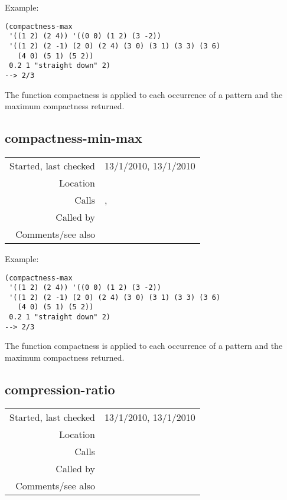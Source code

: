 \vspace{0.5cm}
\noindent Example:
\begin{verbatim}
(compactness-max
 '((1 2) (2 4)) '((0 0) (1 2) (3 -2))
 '((1 2) (2 -1) (2 0) (2 4) (3 0) (3 1) (3 3) (3 6)
   (4 0) (5 1) (5 2))
 0.2 1 "straight down" 2)
--> 2/3
\end{verbatim}

\noindent The function compactness is applied to each
occurrence of a pattern and the maximum compactness
returned.


\subsection*{compactness-min-max}\label{fun:compactness-min-max}

\vspace{0.3cm}
\begin{tabular}{r|p{8cm}}
Started, last checked & 13/1/2010, 13/1/2010 \\
Location & \nameref{sec:evaluation-heuristics} \\
Calls & \nameref{fun:index-item-1st-occurs}, \nameref{fun:my-last} \\
Called by & \nameref{fun:compactness-max} \\
Comments/see also &
\end{tabular}

\vspace{0.5cm}
\noindent Example:
\begin{verbatim}
(compactness-max
 '((1 2) (2 4)) '((0 0) (1 2) (3 -2))
 '((1 2) (2 -1) (2 0) (2 4) (3 0) (3 1) (3 3) (3 6)
   (4 0) (5 1) (5 2))
 0.2 1 "straight down" 2)
--> 2/3
\end{verbatim}

\noindent The function compactness is applied to each
occurrence of a pattern and the maximum compactness
returned.


\subsection*{compression-ratio}\label{fun:compression-ratio}

\vspace{0.3cm}
\begin{tabular}{r|p{8cm}}
Started, last checked & 13/1/2010, 13/1/2010 \\
Location & \nameref{sec:evaluation-heuristics} \\
Calls & \nameref{fun:coverage} \\
Called by & \nameref{fun:heuristics-pattern-translators-pair} \\
Comments/see also &
\end{tabular}

